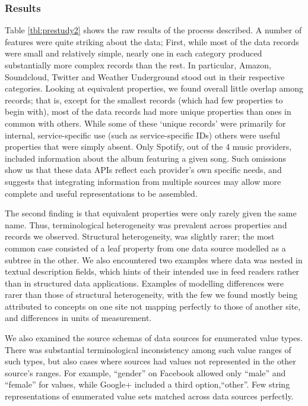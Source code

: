 \documentclass{sigchi}
\begin{document}
\subsubsection{Results}
Table \ref{tbl:prestudy2} shows the raw results of the process described.  A number of features were quite striking about the data; First, while most of the data records were small and relatively simple, nearly one in each category produced substantially more complex records than the rest. In particular, Amazon, Soundcloud, Twitter and Weather Underground stood out in their respective categories. Looking at equivalent properties, we found overall little overlap among records; that is, except for the smallest records (which had few properties to begin with), most of the data records had more unique properties than ones in common with others.  While some of these `unique records' were primarily for internal, service-specific use (such as service-specific IDs) others were useful properties that were simply absent.  Only Spotify, out of the 4 music providers, included information about the album featuring a given song.  Such omissions show us that these data APIs reflect each provider's own specific needs, and suggests that integrating information from multiple sources may allow more complete and useful representations to be assembled.

The second finding is that equivalent properties were only rarely given the same name.  Thus, terminological heterogeneity was prevalent across properties and records we observed.  Structural heterogeneity, was slightly rarer; the most common case consisted of a leaf property from one data source modelled as a subtree in the other.  We also encountered two examples where data was nested in textual description fields, which hints of their intended use in feed readers rather than in structured data applications.  Examples of modelling differences were rarer than those of structural heterogeneity, with the few we found mostly being attributed to concepts on one site not mapping perfectly to those of another site, and differences in units of measurement.

We also examined the source schemas of data sources for enumerated value types.  There was substantial terminological inconsistency among such value ranges of such types, but also cases where sources had values not represented in the other source's ranges.  For example, ``gender''  on Facebook allowed only ``male'' and ``female'' for values, while Google+ included a third option,``other''.  Few string representations of enumerated value sets matched across data sources perfectly.
\end{document}
